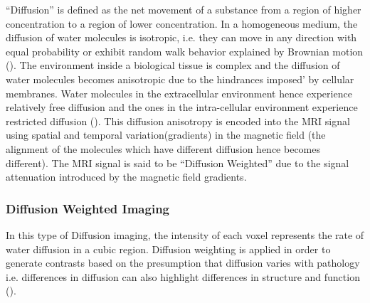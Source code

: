 \documentclass[msthesis.tex]{subfiles}
\begin{document}
“Diffusion” is defined as the net movement of a substance from a region of higher concentration to a region of lower concentration. In a homogeneous medium, the diffusion of water molecules is isotropic, i.e. they can move in any direction with equal probability or exhibit random walk behavior explained by Brownian motion (\cite{Brogioli_2000}).
The environment inside a biological tissue is complex and the diffusion of water molecules becomes anisotropic due to the hindrances imposed’ by cellular membranes. Water molecules in the extracellular environment hence experience relatively free diffusion and the ones in the intra-cellular environment experience restricted diffusion (\cite{toennies2017guide}). This diffusion anisotropy is encoded into the MRI signal using spatial and temporal variation(gradients) in the magnetic field (the alignment of the molecules which have different diffusion hence becomes different). The MRI signal is said to be “Diffusion Weighted” due to the signal attenuation introduced by the magnetic field gradients. 


\subsubsection{Diffusion Weighted Imaging}
\label{sec:DWI}
In this type of Diffusion imaging, the intensity of each voxel represents the rate of water diffusion in a cubic region. Diffusion weighting is applied in order to generate contrasts based on the presumption that diffusion varies with pathology i.e. differences in diffusion can also highlight differences in structure and function (\cite{Taylor_1985}). 
\end{document}
